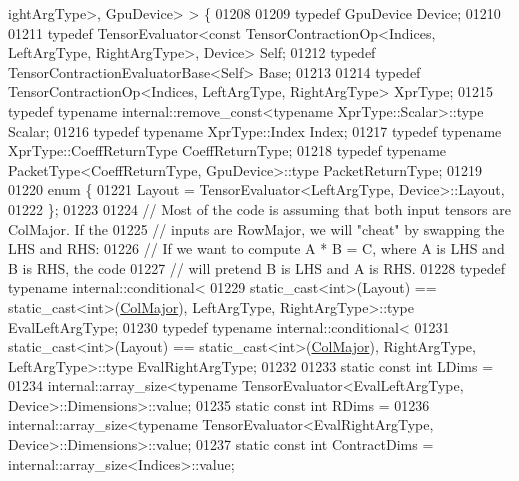 \begin{DoxyCode}
      ightArgType>, GpuDevice> > \{
01208 
01209   \textcolor{keyword}{typedef} GpuDevice Device;
01210 
01211   \textcolor{keyword}{typedef} TensorEvaluator<const TensorContractionOp<Indices, LeftArgType, RightArgType>, Device> Self;
01212   \textcolor{keyword}{typedef} TensorContractionEvaluatorBase<Self> Base;
01213 
01214   \textcolor{keyword}{typedef} TensorContractionOp<Indices, LeftArgType, RightArgType> XprType;
01215   \textcolor{keyword}{typedef} \textcolor{keyword}{typename} internal::remove\_const<typename XprType::Scalar>::type Scalar;
01216   \textcolor{keyword}{typedef} \textcolor{keyword}{typename} XprType::Index Index;
01217   \textcolor{keyword}{typedef} \textcolor{keyword}{typename} XprType::CoeffReturnType CoeffReturnType;
01218   \textcolor{keyword}{typedef} \textcolor{keyword}{typename} PacketType<CoeffReturnType, GpuDevice>::type PacketReturnType;
01219 
01220   \textcolor{keyword}{enum} \{
01221     Layout = TensorEvaluator<LeftArgType, Device>::Layout,
01222   \};
01223 
01224   \textcolor{comment}{// Most of the code is assuming that both input tensors are ColMajor. If the}
01225   \textcolor{comment}{// inputs are RowMajor, we will "cheat" by swapping the LHS and RHS:}
01226   \textcolor{comment}{// If we want to compute A * B = C, where A is LHS and B is RHS, the code}
01227   \textcolor{comment}{// will pretend B is LHS and A is RHS.}
01228   \textcolor{keyword}{typedef} \textcolor{keyword}{typename} internal::conditional<
01229     \textcolor{keyword}{static\_cast<}\textcolor{keywordtype}{int}\textcolor{keyword}{>}(Layout) == static\_cast<int>(\hyperlink{group__enums_ggaacded1a18ae58b0f554751f6cdf9eb13a0cbd4bdd0abcfc0224c5fcb5e4f6669a}{ColMajor}), LeftArgType, RightArgType>::type 
      EvalLeftArgType;
01230   \textcolor{keyword}{typedef} \textcolor{keyword}{typename} internal::conditional<
01231     \textcolor{keyword}{static\_cast<}\textcolor{keywordtype}{int}\textcolor{keyword}{>}(Layout) == static\_cast<int>(\hyperlink{group__enums_ggaacded1a18ae58b0f554751f6cdf9eb13a0cbd4bdd0abcfc0224c5fcb5e4f6669a}{ColMajor}), RightArgType, LeftArgType>::type 
      EvalRightArgType;
01232 
01233   \textcolor{keyword}{static} \textcolor{keyword}{const} \textcolor{keywordtype}{int} LDims =
01234       internal::array\_size<typename TensorEvaluator<EvalLeftArgType, Device>::Dimensions>::value;
01235   \textcolor{keyword}{static} \textcolor{keyword}{const} \textcolor{keywordtype}{int} RDims =
01236       internal::array\_size<typename TensorEvaluator<EvalRightArgType, Device>::Dimensions>::value;
01237   \textcolor{keyword}{static} \textcolor{keyword}{const} \textcolor{keywordtype}{int} ContractDims = internal::array\_size<Indices>::value;

\end{DoxyCode}
